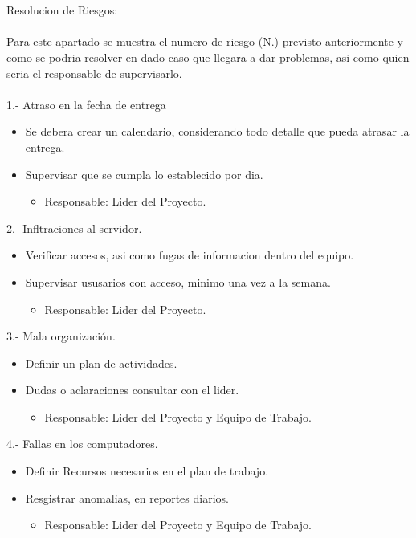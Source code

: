 \documentclass[40pt]{article}
\begin{document}
\maketitle
\textsf{\ \\
\\
Resolucion de Riesgos:\\
\\
Para este apartado se muestra el numero de riesgo (N.) previsto anteriormente y como se podria resolver en dado caso que llegara a dar problemas, asi como quien seria el responsable de supervisarlo. \\}
\\
1.- Atraso en la fecha de entrega
\begin{itemize}
    \item Se debera crear un calendario, considerando todo detalle que pueda atrasar la entrega.
    \item Supervisar que se cumpla lo establecido por dia.
    \begin{itemize}
      \item Responsable: Lider del Proyecto.
    \end{itemize}  
\end{itemize}
2.- Infltraciones al servidor.
\begin{itemize}
    \item Verificar accesos, asi como fugas de informacion dentro del equipo.
    \item Supervisar ususarios con acceso, minimo una vez a la semana.
    \begin{itemize}
      \item Responsable: Lider del Proyecto.
    \end{itemize}  
\end{itemize}
3.- Mala organización.
\begin{itemize}
    \item Definir un plan de actividades.
    \item Dudas o aclaraciones consultar con el lider.
    \begin{itemize}
      \item Responsable: Lider del Proyecto y Equipo de Trabajo.
    \end{itemize}  
\end{itemize}
4.- Fallas en los computadores.
\begin{itemize}
    \item Definir Recursos necesarios en el plan de trabajo.
    \item Resgistrar anomalias, en reportes diarios.
    \begin{itemize}
      \item Responsable: Lider del Proyecto y Equipo de Trabajo.
    \end{itemize}  
\end{itemize}
\end{document}
